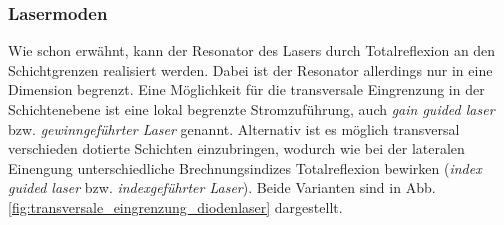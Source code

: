 \subsubsection{Lasermoden}\label{subsubsec:lasermoden}
Wie schon erwähnt, kann der Resonator des Lasers durch Totalreflexion an den
Schichtgrenzen realisiert werden. Dabei ist der Resonator allerdings nur in eine
Dimension begrenzt. Eine Möglichkeit für die transversale Eingrenzung in
der Schichtenebene ist eine lokal begrenzte Stromzuführung, auch \textit{gain
guided laser} bzw. \textit{gewinngeführter Laser} genannt. Alternativ ist es
möglich transversal verschieden dotierte Schichten einzubringen, wodurch wie bei
der lateralen Einengung unterschiedliche Brechnungsindizes Totalreflexion
bewirken (\textit{index guided laser} bzw. \textit{indexgeführter Laser}). Beide
Varianten sind in Abb. \ref{fig:transversale_eingrenzung_diodenlaser}
dargestellt.
